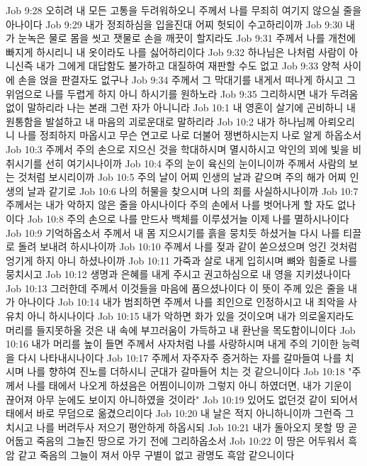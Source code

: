Job 9:28  오히려 내 모든 고통을 두려워하오니 주께서 나를 무죄히 여기지 않으실 줄을 아나이다
Job 9:29  내가 정죄하심을 입을진대 어찌 헛되이 수고하리이까
Job 9:30  내가 눈녹은 물로 몸을 씻고 잿물로 손을 깨끗이 할지라도
Job 9:31  주께서 나를 개천에 빠지게 하시리니 내 옷이라도 나를 싫어하리이다
Job 9:32  하나님은 나처럼 사람이 아니신즉 내가 그에게 대답함도 불가하고 대질하여 재판할 수도 없고
Job 9:33  양척 사이에 손을 얹을 판결자도 없구나
Job 9:34  주께서 그 막대기를 내게서 떠나게 하시고 그 위엄으로 나를 두렵게 하지 아니 하시기를 원하노라
Job 9:35  그리하시면 내가 두려움 없이 말하리라 나는 본래 그런 자가 아니니라
Job 10:1  내 영혼이 살기에 곤비하니 내 원통함을 발설하고 내 마음의 괴로운대로 말하리라
Job 10:2  내가 하나님께 아뢰오리니 나를 정죄하지 마옵시고 무슨 연고로 나로 더불어 쟁변하시는지 나로 알게 하옵소서
Job 10:3  주께서 주의 손으로 지으신 것을 학대하시며 멸시하시고 악인의 꾀에 빛을 비취시기를 선히 여기시나이까
Job 10:4  주의 눈이 육신의 눈이니이까 주께서 사람의 보는 것처럼 보시리이까
Job 10:5  주의 날이 어찌 인생의 날과 같으며 주의 해가 어찌 인생의 날과 같기로
Job 10:6  나의 허물을 찾으시며 나의 죄를 사실하시나이까
Job 10:7  주께서는 내가 악하지 않은 줄을 아시나이다 주의 손에서 나를 벗어나게 할 자도 없나이다
Job 10:8  주의 손으로 나를 만드사 백체를 이루셨거늘 이제 나를 멸하시나이다
Job 10:9  기억하옵소서 주께서 내 몸 지으시기를 흙을 뭉치듯 하셨거늘 다시 나를 티끌로 돌려 보내려 하시나이까
Job 10:10  주께서 나를 젖과 같이 쏟으셨으며 엉긴 것처럼 엉기게 하지 아니 하셨나이까
Job 10:11  가죽과 살로 내게 입히시며 뼈와 힘줄로 나를 뭉치시고
Job 10:12  생명과 은혜를 내게 주시고 권고하심으로 내 영을 지키셨나이다
Job 10:13  그러한데 주께서 이것들을 마음에 품으셨나이다 이 뜻이 주께 있은 줄을 내가 아나이다
Job 10:14  내가 범죄하면 주께서 나를 죄인으로 인정하시고 내 죄악을 사유치 아니 하시나이다
Job 10:15  내가 악하면 화가 있을 것이오며 내가 의로울지라도 머리를 들지못하올 것은 내 속에 부끄러움이 가득하고 내 환난을 목도함이니이다
Job 10:16  내가 머리를 높이 들면 주께서 사자처럼 나를 사랑하시며 내게 주의 기이한 능력을 다시 나타내시나이다
Job 10:17  주께서 자주자주 증거하는 자를 갈마들여 나를 치시며 나를 향하여 진노를 더하시니 군대가 갈마들어 치는 것 같으니이다
Job 10:18  "주께서 나를 태에서 나오게 하셨음은 어찜이니이까 그렇지 아니 하였더면, 내가 기운이 끊어져 아무 눈에도 보이지 아니하였을 것이라"
Job 10:19  있어도 없던것 같이 되어서 태에서 바로 무덤으로 옮겼으리이다
Job 10:20  내 날은 적지 아니하니이까 그런즉 그치시고 나를 버려두사 저으기 평안하게 하옵시되
Job 10:21  내가 돌아오지 못할 땅 곧 어둡고 죽음의 그늘진 땅으로 가기 전에 그리하옵소서
Job 10:22  이 땅은 어두워서 흑암 같고 죽음의 그늘이 져서 아무 구별이 없고 광명도 흑암 같으니이다
